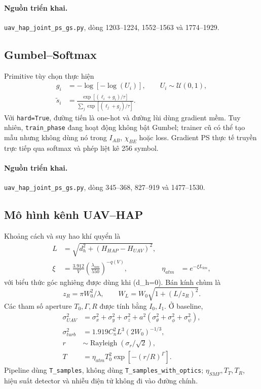 \paragraph{Nguồn triển khai.} \texttt{uav\_hap\_joint\_ps\_gs.py}, dòng 1203--1224, 1552--1563 và 1774--1929.

\subsection{Gumbel--Softmax}

Primitive tùy chọn thực hiện
\begin{align}
g_i&=-\log[-\log(U_i)],\qquad U_i\sim\mathcal U(0,1),\\
\widetilde s_i&=\frac{\exp[(\ell_i+g_i)/\tau]}
{\sum_j\exp[(\ell_j+g_j)/\tau]}.
\end{align}
Với \texttt{hard=True}, đường tiến là one-hot và đường lùi dùng gradient mềm. Tuy nhiên, \texttt{train\_phase} đang hoạt động không bật Gumbel; trainer cũ có thể tạo mẫu nhưng không dùng nó trong \(I_{AB}\), \(\chi_{BE}\) hoặc loss. Gradient PS thực tế truyền trực tiếp qua softmax và phép liệt kê 256 symbol.

\paragraph{Nguồn triển khai.} \texttt{uav\_hap\_joint\_ps\_gs.py}, dòng 345--368, 827--919 và 1477--1530.

\subsection{Mô hình kênh UAV--HAP}

Khoảng cách và suy hao khí quyển là
\begin{align}
L&=\sqrt{d_h^2+(H_{HAP}-H_{UAV})^2},\\
\xi&=\frac{3.912}{V}\left(\frac{\lambda_{nm}}{550}\right)^{-q(V)},
&\eta_{atm}&=e^{-\xi L_{km}},
\end{align}
với biểu thức góc nghiêng được dùng khi (d_h=0). Bán kính chùm là
\begin{equation}
z_R=\pi W_0^2/\lambda,\qquad W_L=W_0\sqrt{1+(L/z_R)^2}.
\end{equation}
Các tham số aperture \(T_0,\Gamma,R\) được tính bằng \(I_0,I_1\). Ở baseline,
\begin{align}
\sigma_{UAV}^2&=\sigma_x^2+\sigma_y^2+\sigma_z^2
+a^2(\sigma_\theta^2+\sigma_\phi^2+\sigma_\psi^2),\\
\sigma_{turb}^2&=1.919C_n^2L^3(2W_0)^{-1/3},\\
r&\sim\operatorname{Rayleigh}(\sigma_r/\sqrt2),\\
T&=\eta_{atm}T_0^2\exp[-(r/R)^\Gamma].
\end{align}
Pipeline dùng \texttt{T\_samples}, không dùng \texttt{T\_samples\_with\_optics}; \(\eta_{SMF},T_T,T_R\), hiệu suất detector và nhiễu điện tử không đi vào đường chính.


